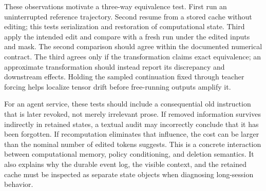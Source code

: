 These observations motivate a three-way equivalence test. First run an uninterrupted reference trajectory. Second resume from a stored cache without editing; this tests serialization and restoration of computational state. Third apply the intended edit and compare with a fresh run under the edited inputs and mask. The second comparison should agree within the documented numerical contract. The third agrees only if the transformation claims exact equivalence; an approximate transformation should instead report its discrepancy and downstream effects. Holding the sampled continuation fixed through teacher forcing helps localize tensor drift before free-running outputs amplify it.

For an agent service, these tests should include a consequential old instruction that is later revoked, not merely irrelevant prose. If removed information survives indirectly in retained states, a textual audit may incorrectly conclude that it has been forgotten. If recomputation eliminates that influence, the cost can be larger than the nominal number of edited tokens suggests. This is a concrete interaction between computational memory, policy conditioning, and deletion semantics. It also explains why the durable event log, the visible context, and the retained cache must be inspected as separate state objects when diagnosing long-session behavior.
